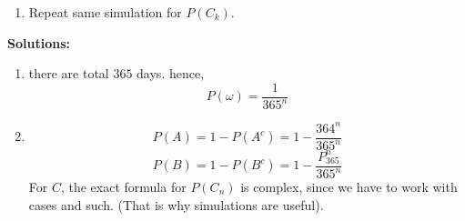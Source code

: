\begin{enumerate}
\begin{enumerate}
        \item Repeat same simulation for $P(C_k)$.
    \end{enumerate}
    \textbf{Solutions:}\\
    \begin{enumerate}
        \item there are total $365$ days. hence,
            \[ P(\omega) = \frac{1}{365^n}\]
        \item \[ P(A) = 1 - P(A^c) = 1 - \frac{364^n}{365^n}\] 
            \[ P(B) = 1 - P(B^c) =1 - \frac{P^{n}_{365}}{365^n}\]
        For $C$, the exact formula for $P(C_n)$ is complex, since we have to work with cases and such. (That is why simulations are useful).
    \end{enumerate}
\end{enumerate}




